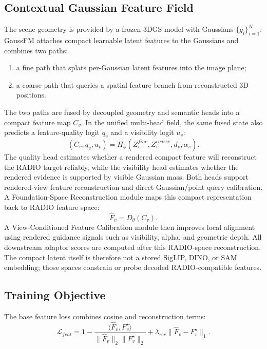 \documentclass[journal,twoside]{IEEEtran}
\newcommand{\method}{GaussFM}
\begin{document}
\subsection{Contextual Gaussian Feature Field}

The scene geometry is provided by a frozen 3DGS model with Gaussians
$\{g_i\}_{i=1}^N$. \method{} attaches compact learnable latent features to the
Gaussians and combines two paths:
\begin{enumerate}
  \item a fine path that splats per-Gaussian latent features into the image
  plane;
  \item a coarse path that queries a spatial feature branch from reconstructed
  3D positions.
\end{enumerate}
The two paths are fused by decoupled geometry and semantic heads into a compact
feature map $C_v$. In the unified multi-head field, the same fused state also
predicts a feature-quality logit $q_v$ and a visibility logit $u_v$:
\begin{equation}
  (C_v, q_v, u_v) = H_{\phi}(Z_v^{fine}, Z_v^{coarse}, d_v, \alpha_v).
\end{equation}
The quality head estimates whether a rendered compact feature will reconstruct
the RADIO target reliably, while the visibility head estimates whether the
rendered evidence is supported by visible Gaussian mass. Both heads support
rendered-view feature reconstruction and direct Gaussian/point query calibration. A
Foundation-Space Reconstruction module maps this compact representation back to
RADIO feature space:
\begin{equation}
  \hat{F}_v = D_{\theta}(C_v).
\end{equation}
A View-Conditioned Feature Calibration module then improves local alignment
using rendered guidance signals such as visibility, alpha, and geometric depth.
All downstream adaptor scores are computed after this RADIO-space
reconstruction. The compact latent itself is therefore not a stored SigLIP,
DINO, or SAM embedding; those spaces constrain or probe decoded RADIO-compatible
features.

\subsection{Training Objective}

The base feature loss combines cosine and reconstruction terms:
\begin{equation}
  \mathcal{L}_{feat}
  =
  1 - \frac{\langle \hat{F}_v, F_v^{\star} \rangle}
  {\|\hat{F}_v\|_2 \|F_v^{\star}\|_2}
  + \lambda_{rec}\|\hat{F}_v - F_v^{\star}\|_1.
\end{equation}
\end{document}
